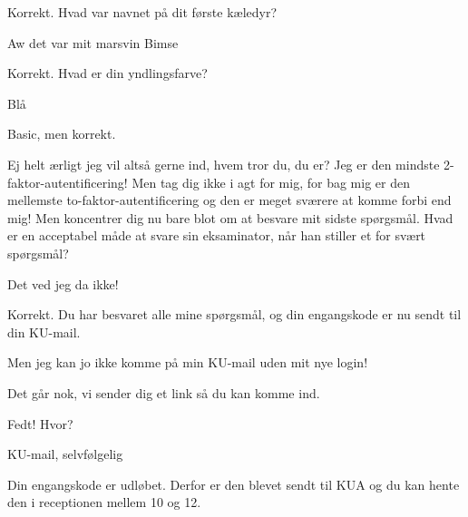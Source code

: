 \documentclass[a4paper,11pt]{article}
\begin{document}
\begin{sketch}
 Korrekt. Hvad var navnet på dit første kæledyr?

 Aw det var mit marsvin Bimse

 Korrekt. Hvad er din yndlingsfarve?

 Blå

 Basic, men korrekt. 

 Ej helt ærligt jeg vil altså gerne ind, hvem tror du, du er?
 Jeg er den mindste 2-faktor-autentificering! Men tag dig ikke i agt for mig, for bag mig er den mellemste to-faktor-autentificering og den er meget sværere at komme forbi end mig! Men koncentrer dig nu bare blot om at besvare mit sidste spørgsmål. Hvad er en acceptabel måde at svare sin eksaminator, når han stiller et for svært spørgsmål?

 Det ved jeg da ikke!

 Korrekt. Du har besvaret alle mine spørgsmål, og din engangskode er nu sendt til din KU-mail.


 Men jeg kan jo ikke komme på min KU-mail uden mit nye login!

 Det går nok, vi sender dig et link så du kan komme ind.

 Fedt! Hvor? 

 KU-mail, selvfølgelig


 Din engangskode er udløbet. Derfor er den blevet sendt til KUA og du kan hente den i receptionen mellem 10 og 12.

\end{sketch}
\end{document}
